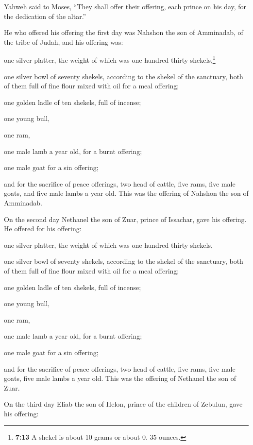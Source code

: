 Yahweh said to Moses, ``They shall offer their offering,
each prince on his day, for the dedication of the altar.''

 He who offered his offering the first day was Nahshon
the son of Amminadab, of the tribe of Judah,  and his
offering was:

one silver platter, the weight of which was one hundred thirty
shekels,\footnote{\textbf{7:13} A shekel is about 10 grams or about 0.
  35 ounces.}

one silver bowl of seventy shekels, according to the shekel of the
sanctuary, both of them full of fine flour mixed with oil for a meal
offering;

 one golden ladle of ten shekels, full of incense;

 one young bull,

one ram,

one male lamb a year old, for a burnt offering;

 one male goat for a sin offering;

 and for the sacrifice of peace offerings, two head of
cattle, five rams, five male goats, and five male lambs a year old. This
was the offering of Nahshon the son of Amminadab.

 On the second day Nethanel the son of Zuar, prince of
Issachar, gave his offering.  He offered for his
offering:

one silver platter, the weight of which was one hundred thirty shekels,

one silver bowl of seventy shekels, according to the shekel of the
sanctuary, both of them full of fine flour mixed with oil for a meal
offering;

 one golden ladle of ten shekels, full of incense;

 one young bull,

one ram,

one male lamb a year old, for a burnt offering;

 one male goat for a sin offering;

 and for the sacrifice of peace offerings, two head of
cattle, five rams, five male goats, five male lambs a year old. This was
the offering of Nethanel the son of Zuar.

 On the third day Eliab the son of Helon, prince of the
children of Zebulun,  gave his offering:

